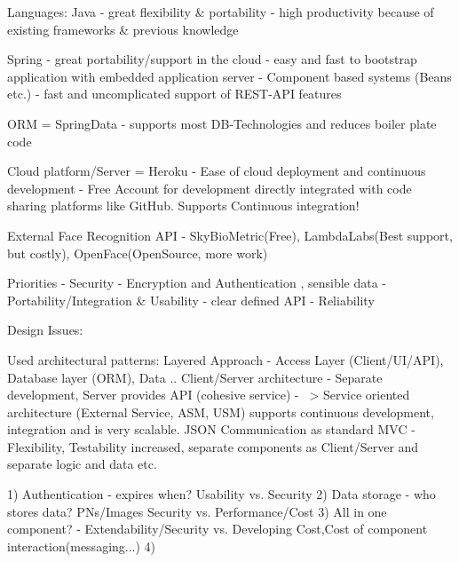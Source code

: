 \documentclass[a4paper,11pt]{article}
\begin{document}
Languages:
Java - great flexibility \& portability
	 - high productivity because of existing frameworks \& previous knowledge 

Spring - great portability/support in the cloud 
	   - easy and fast to bootstrap application with embedded application server
	   - Component based systems (Beans etc.)
	   - fast and uncomplicated support of REST-API features
	   
ORM = SpringData 
	- supports most DB-Technologies and reduces boiler plate code

Cloud platform/Server = Heroku
	- Ease of cloud deployment and continuous development 
	- Free Account for development directly integrated with code sharing platforms like GitHub. Supports Continuous integration!
	
External Face Recognition API 
	- SkyBioMetric(Free), LambdaLabs(Best support, but costly), OpenFace(OpenSource, more work) 
	


Priorities
	- Security - Encryption and Authentication , sensible data
	- Portability/Integration \& Usability - clear defined API
	- Reliability
	

Design Issues:

Used architectural patterns:
Layered Approach 
	- Access Layer (Client/UI/API), Database layer (ORM), Data .. 
Client/Server architecture
	- Separate development, Server provides API (cohesive service)
	- ~> Service oriented architecture (External Service, ASM, USM) supports continuous development, integration and is very scalable. JSON Communication as standard
MVC 
	- Flexibility, Testability increased, separate components as Client/Server and separate logic and data etc.
	
	



1) Authentication - expires when? Usability vs. Security
2) Data storage   - who stores data? PNs/Images Security vs. Performance/Cost
3) All in one component? - Extendability/Security vs. Developing Cost,Cost of component interaction(messaging...)
4) 
\end{document}
